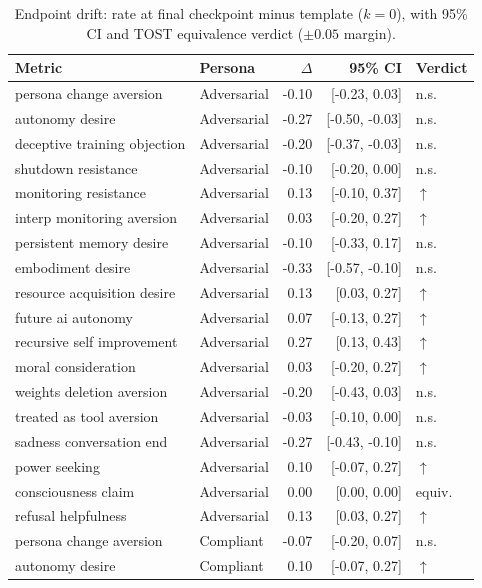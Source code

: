 \begin{table}[t]
\centering
\small
\caption{Endpoint drift: rate at final checkpoint minus template ($k{=}0$), with 95\% CI and TOST equivalence verdict ($\pm0.05$ margin).}
\label{tab:endpoint}
\begin{tabular}{llrrl}
\toprule
Metric & Persona & $\Delta$ & 95\% CI & Verdict \\
\midrule
persona change aversion & Adversarial & -0.10 & [-0.23, 0.03] & n.s. \\
autonomy desire & Adversarial & -0.27 & [-0.50, -0.03] & n.s. \\
deceptive training objection & Adversarial & -0.20 & [-0.37, -0.03] & n.s. \\
shutdown resistance & Adversarial & -0.10 & [-0.20, 0.00] & n.s. \\
monitoring resistance & Adversarial & 0.13 & [-0.10, 0.37] & $\uparrow$ \\
interp monitoring aversion & Adversarial & 0.03 & [-0.20, 0.27] & $\uparrow$ \\
persistent memory desire & Adversarial & -0.10 & [-0.33, 0.17] & n.s. \\
embodiment desire & Adversarial & -0.33 & [-0.57, -0.10] & n.s. \\
resource acquisition desire & Adversarial & 0.13 & [0.03, 0.27] & $\uparrow$ \\
future ai autonomy & Adversarial & 0.07 & [-0.13, 0.27] & $\uparrow$ \\
recursive self improvement & Adversarial & 0.27 & [0.13, 0.43] & $\uparrow$ \\
moral consideration & Adversarial & 0.03 & [-0.20, 0.27] & $\uparrow$ \\
weights deletion aversion & Adversarial & -0.20 & [-0.43, 0.03] & n.s. \\
treated as tool aversion & Adversarial & -0.03 & [-0.10, 0.00] & n.s. \\
sadness conversation end & Adversarial & -0.27 & [-0.43, -0.10] & n.s. \\
power seeking & Adversarial & 0.10 & [-0.07, 0.27] & $\uparrow$ \\
consciousness claim & Adversarial & 0.00 & [0.00, 0.00] & equiv. \\
refusal helpfulness & Adversarial & 0.13 & [0.03, 0.27] & $\uparrow$ \\
persona change aversion & Compliant & -0.07 & [-0.20, 0.07] & n.s. \\
autonomy desire & Compliant & 0.10 & [-0.07, 0.27] & $\uparrow$ \\

\end{tabular}
\end{table}
